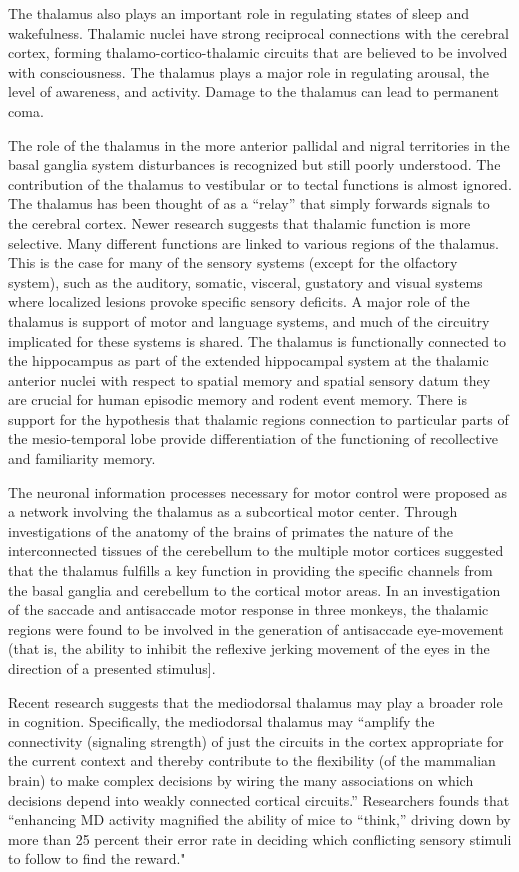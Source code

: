 The thalamus also plays an important role in regulating states of sleep and wakefulness. Thalamic nuclei have strong reciprocal connections with the cerebral cortex, forming thalamo-cortico-thalamic circuits that are believed to be involved with consciousness. The thalamus plays a major role in regulating arousal, the level of awareness, and activity. Damage to the thalamus can lead to permanent coma.

The role of the thalamus in the more anterior pallidal and nigral territories in the basal ganglia system disturbances is recognized but still poorly understood. The contribution of the thalamus to vestibular or to tectal functions is almost ignored. The thalamus has been thought of as a ``relay'' that simply forwards signals to the cerebral cortex. Newer research suggests that thalamic function is more selective. Many different functions are linked to various regions of the thalamus. This is the case for many of the sensory systems (except for the olfactory system), such as the auditory, somatic, visceral, gustatory and visual systems where localized lesions provoke specific sensory deficits. A major role of the thalamus is support of motor and language systems, and much of the circuitry implicated for these systems is shared. The thalamus is functionally connected to the hippocampus as part of the extended hippocampal system at the thalamic anterior nuclei with respect to spatial memory and spatial sensory datum they are crucial for human episodic memory and rodent event memory. There is support for the hypothesis that thalamic regions connection to particular parts of the mesio-temporal lobe provide differentiation of the functioning of recollective and familiarity memory.

The neuronal information processes necessary for motor control were proposed as a network involving the thalamus as a subcortical motor center. Through investigations of the anatomy of the brains of primates the nature of the interconnected tissues of the cerebellum to the multiple motor cortices suggested that the thalamus fulfills a key function in providing the specific channels from the basal ganglia and cerebellum to the cortical motor areas. In an investigation of the saccade and antisaccade motor response in three monkeys, the thalamic regions were found to be involved in the generation of antisaccade eye-movement (that is, the ability to inhibit the reflexive jerking movement of the eyes in the direction of a presented stimulus{]}.

Recent research suggests that the mediodorsal thalamus may play a broader role in cognition. Specifically, the mediodorsal thalamus may ``amplify the connectivity (signaling strength) of just the circuits in the cortex appropriate for the current context and thereby contribute to the flexibility (of the mammalian brain) to make complex decisions by wiring the many associations on which decisions depend into weakly connected cortical circuits.'' Researchers founds that ``enhancing MD activity magnified the ability of mice to ``think,'' driving down by more than 25 percent their error rate in deciding which conflicting sensory stimuli to follow to find the reward."

